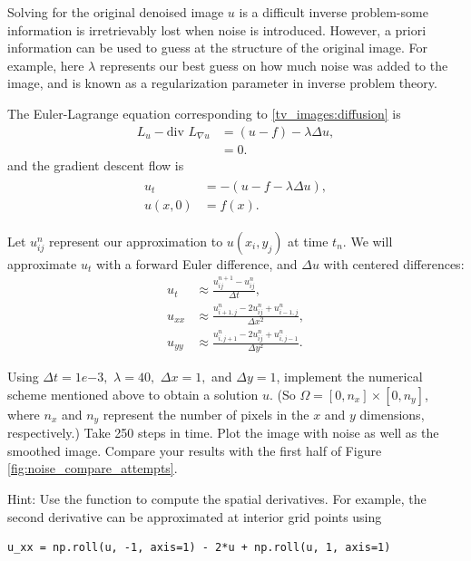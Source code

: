 Solving for the original denoised image $u$ is a difficult inverse problem-some information is irretrievably lost when noise is introduced. However, a priori information can be used to guess at the structure of the original image.  For example, here $\lambda$ represents our best guess on how much noise was added to the image, and is known as a regularization parameter in inverse problem theory.

The Euler-Lagrange equation corresponding to \eqref{tv_images:diffusion} is
\begin{align*}
L_u - \text{div } L_{\nabla u} &= (u-f) - \lambda \Delta u,\\
&= 0.
\end{align*}
and the gradient descent flow is
\begin{align}
    \begin{split}
u_t &= -(u-f -\lambda \Delta u),\\
u(x,0) &= f(x).
    \end{split} \label{tv_images:diffusion_flow}
\end{align}

Let $u_{ij}^n$ represent our approximation to $u(x_i,y_j)$ at time $t_n$. We will approximate $u_t$ with a forward Euler difference, and $\Delta u$ with centered differences:
\begin{align*}
    u_t &\approx \frac{u_{ij}^{n+1}-u_{ij}^n}{\Delta t},\\
    u_{xx} &\approx \frac{u_{i+1,j}^{n}-2u_{ij}^n + u_{i-1,j}^n}{\Delta x^2}, \\
    u_{yy} &\approx \frac{u_{i,j+1}^{n}-2u_{ij}^n + u_{i,j-1}^n}{\Delta y^2}.
\end{align*}


\begin{problem}
Using $\Delta t = 1e{-3},$ $\lambda = 40,$ $\Delta x = 1,$ and $\Delta y = 1$, implement the numerical scheme mentioned above to obtain a solution $u$. (So $\Omega = [0,n_x]\times [0,n_y]$, where $n_x$ and $n_y$ represent the number of pixels in the $x$ and $y$ dimensions, respectively.) Take 250 steps in time. Plot the image with noise as well as the smoothed image. Compare your results with the first half of Figure \ref{fig:noise_compare_attempts}.

Hint: Use the function  to compute the spatial derivatives. For example, the second derivative can be approximated at interior grid points using
\begin{lstlisting}
u_xx = np.roll(u, -1, axis=1) - 2*u + np.roll(u, 1, axis=1)
\end{lstlisting}
\end{problem}





